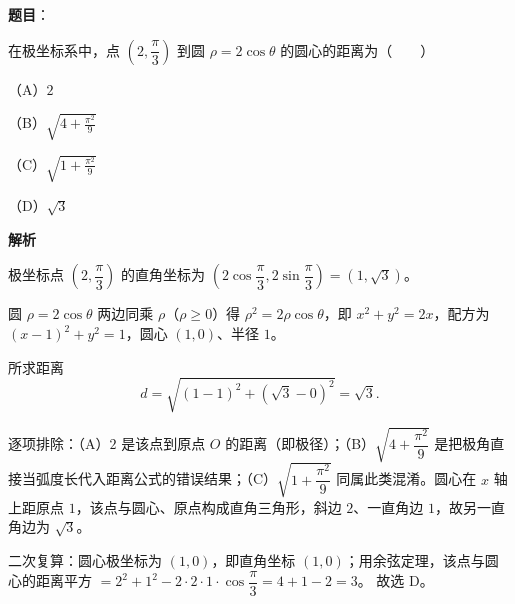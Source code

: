 \begin{answer}

\textbf{题目}：

在极坐标系中，点 $\left(2,\dfrac{\pi}{3}\right)$ 到圆 $\rho=2\cos\theta$ 的圆心的距离为\mbox{（　　）}

（A）$2$

（B）$\sqrt{4+\frac{\pi^2}{9}}$

（C）$\sqrt{1+\frac{\pi^2}{9}}$

（D）$\sqrt3$

\textbf{解析}

极坐标点 $\left(2,\dfrac{\pi}{3}\right)$ 的直角坐标为 $\left(2\cos\dfrac{\pi}{3},2\sin\dfrac{\pi}{3}\right)=(1,\sqrt3)$。

圆 $\rho=2\cos\theta$ 两边同乘 $\rho$（$\rho\geqslant0$）得 $\rho^2=2\rho\cos\theta$，即 $x^2+y^2=2x$，配方为 $(x-1)^2+y^2=1$，圆心 $(1,0)$、半径 $1$。

所求距离
\nopagebreak[4]
\[d=\sqrt{(1-1)^2+(\sqrt3-0)^2}=\sqrt3.\]

逐项排除：（A）$2$ 是该点到原点 $O$ 的距离（即极径）；（B）$\sqrt{4+\dfrac{\pi^2}{9}}$ 是把极角直接当弧度长代入距离公式的错误结果；（C）$\sqrt{1+\dfrac{\pi^2}{9}}$ 同属此类混淆。圆心在 $x$ 轴上距原点 $1$，该点与圆心、原点构成直角三角形，斜边 $2$、一直角边 $1$，故另一直角边为 $\sqrt3$。

二次复算：圆心极坐标为 $(1,0)$，即直角坐标 $(1,0)$；用余弦定理，该点与圆心的距离平方 $=2^2+1^2-2\cdot2\cdot1\cdot\cos\dfrac{\pi}{3}=4+1-2=3$。
故选 D。


\end{answer}
